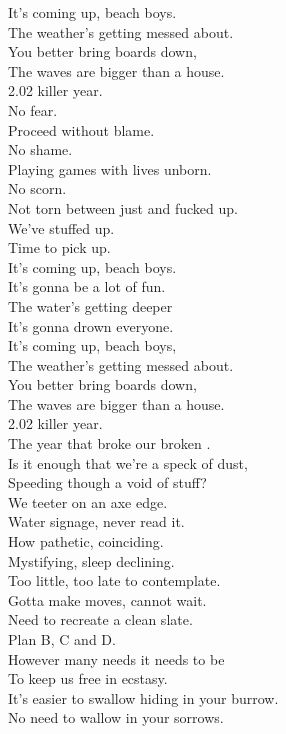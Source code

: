 It's coming up, beach boys. \\
The weather's getting messed about. \\
You better bring boards down, \\
The waves are bigger than a house. \\

2.02 killer year. \\
No fear. \\
Proceed without blame. \\
No shame. \\
Playing games with lives unborn. \\
No scorn. \\
Not torn between just and fucked up. \\
We've stuffed up. \\
Time to pick up. \\

It's coming up, beach boys. \\
It's gonna be a lot of fun. \\
The water's getting deeper \\
It's gonna drown everyone. \\

It's coming up, beach boys, \\
The weather's getting messed about. \\
You better bring boards down, \\
The waves are bigger than a house. \\

2.02 killer year. \\
The year that broke our broken . \\
Is it enough that we're a speck of dust, \\
Speeding though a void of stuff? \\
We teeter on an axe edge. \\

Water signage, never read it. \\
How pathetic, coinciding. \\
Mystifying, sleep declining. \\
Too little, too late to contemplate. \\

Gotta make moves, cannot wait. \\
Need to recreate a clean slate. \\
Plan B, C and D. \\
However many needs it needs to be \\
To keep us free in ecstasy. \\
It's easier to swallow hiding in your burrow. \\
No need to wallow in your sorrows. \\

